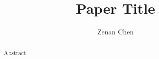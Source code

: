 \documentclass[11pt]{article}
\title{Paper Title}
\author{Zenan Chen}
\date{\vspace{-3em}}
\begin{document}
\doublespacing

\maketitle

\begin{abstract}
  Abstract
\end{abstract}










\end{document}
